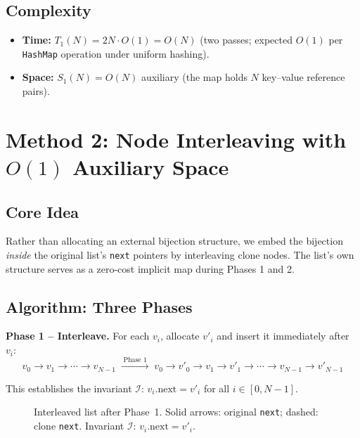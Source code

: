 \documentclass[10pt,journal,compsoc]{IEEEtran}
\begin{document}
\subsection{Complexity}
\begin{itemize}
  \item \textbf{Time:} $T_1(N) = 2N \cdot O(1) = O(N)$ (two passes; expected $O(1)$ per \texttt{HashMap} operation under uniform hashing).
  \item \textbf{Space:} $S_1(N) = O(N)$ auxiliary (the map holds $N$ key--value reference pairs).
\end{itemize}

\section{Method 2: Node Interleaving with $O(1)$ Auxiliary Space}
\label{sec:method2}

\subsection{Core Idea}

Rather than allocating an external bijection structure, we embed the bijection \textit{inside} the original list's \texttt{next} pointers by interleaving clone nodes. The list's own structure serves as a zero-cost implicit map during Phases 1 and 2.

\subsection{Algorithm: Three Phases}

\textbf{Phase 1 -- Interleave.} For each $v_i$, allocate $v'_i$ and insert it immediately after $v_i$:
\[
  v_0 \to v_1 \to \cdots \to v_{N-1}
  \;\xrightarrow{\;\text{Phase 1}\;}\;
  v_0 \to v'_0 \to v_1 \to v'_1 \to \cdots \to v_{N-1} \to v'_{N-1}
\]

This establishes the invariant $\mathcal{I}$: $v_i.\mathrm{next} = v'_i$ for all $i \in [0, N{-}1]$.

\begin{figure}[htbp]
\centering
{}
\caption{Interleaved list after Phase~1. Solid arrows: original \texttt{next}; dashed: clone \texttt{next}. Invariant $\mathcal{I}$: $v_i.\mathrm{next} = v'_i$.}
\label{fig:interleave}
\end{figure}
\end{document}
